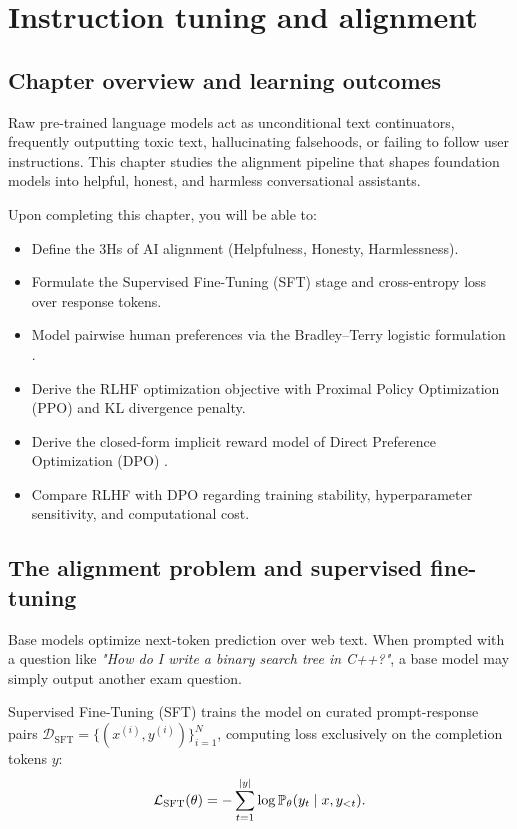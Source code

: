 \documentclass[../../main.tex]{subfiles}
\begin{document}
\chapter{Instruction tuning and alignment}
\label{ch:instruction_tuning_alignment}

\section{Chapter overview and learning outcomes}
Raw pre-trained language models act as unconditional text continuators, frequently outputting toxic text, hallucinating falsehoods, or failing to follow user instructions. This chapter studies the alignment pipeline that shapes foundation models into helpful, honest, and harmless conversational assistants.

Upon completing this chapter, you will be able to:
\begin{itemize}
    \item Define the 3Hs of AI alignment (Helpfulness, Honesty, Harmlessness).
    \item Formulate the Supervised Fine-Tuning (SFT) stage and cross-entropy loss over response tokens.
    \item Model pairwise human preferences via the Bradley--Terry logistic formulation \citep{ouyang2022}.
    \item Derive the RLHF optimization objective with Proximal Policy Optimization (PPO) and KL divergence penalty.
    \item Derive the closed-form implicit reward model of Direct Preference Optimization (DPO) \citep{rafailov2023}.
    \item Compare RLHF with DPO regarding training stability, hyperparameter sensitivity, and computational cost.
\end{itemize}

\section{The alignment problem and supervised fine-tuning}
Base models optimize next-token prediction over web text. When prompted with a question like \emph{"How do I write a binary search tree in C++?"}, a base model may simply output another exam question.

Supervised Fine-Tuning (SFT) trains the model on curated prompt-response pairs $\mathcal{D}_{\text{SFT}} = \{(x^{(i)}, y^{(i)})\}_{i=1}^N$, computing loss exclusively on the completion tokens $y$:
\begin{equation}
\mathcal{L}_{\text{SFT}}(\theta) = -\sum_{t=1}^{|y|} \log \mathbb{P}_\theta(y_t \mid x, y_{<t}).
\end{equation}
\end{document}
